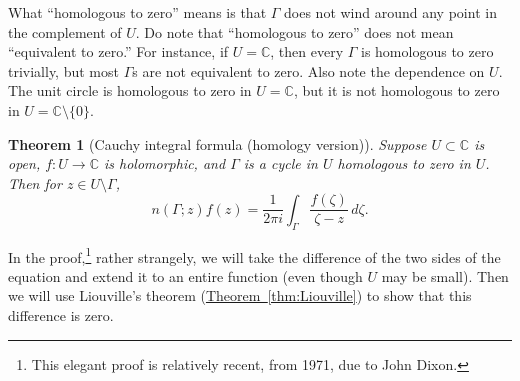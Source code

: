 \documentclass[12pt,openany]{book}
\newcommand{\C}{{\mathbb{C}}}
\newcommand{\myquote}[1]{``#1''}
\theoremstyle{plain}
\newtheorem{thm}{Theorem}[section]
\theoremstyle{remark}
\theoremstyle{definition}
\theoremstyle{exercise}
\theoremstyle{example}
\newcommand{\thmref}[1]{\hyperref[#1]{Theorem~\ref*{#1}}}
\begin{document}
What \myquote{homologous to zero} means is that $\Gamma$ does not wind around any
point in the complement of $U$.
Do note that \myquote{homologous to zero} does not mean
\myquote{equivalent to zero.}
For instance, if $U = \C$, then every $\Gamma$ is homologous to zero
trivially, but most $\Gamma$s are not equivalent to zero.
Also note the dependence on $U$.  The unit circle is homologous to zero in
$U = \C$, but it is not homologous to zero in $U = \C \setminus \{ 0 \}$.

\begin{thm}[Cauchy integral formula (homology version)]
\label{thm:CIFhomology}
Suppose $U \subset \C$ is open, $f \colon U \to \C$ is holomorphic, and
$\Gamma$ is
a cycle
in $U$
homologous to zero in $U$.
Then for $z \in U \setminus \Gamma$,
\begin{equation*}
n(\Gamma;z)
f(z)
=
\frac{1}{2\pi i}
\int_{\Gamma}
\frac{f(\zeta)}{\zeta-z}
\,
d \zeta .
\end{equation*}
\end{thm}

In the proof,\footnote{%
This elegant proof is relatively recent, from 1971, due to John Dixon.}
rather strangely, we will take the difference of the two
sides of the equation and extend it to an entire
function (even though $U$ may be small).  Then we will use
Liouville's theorem (\thmref{thm:Liouville}) to show that this difference is
zero.
\end{document}
